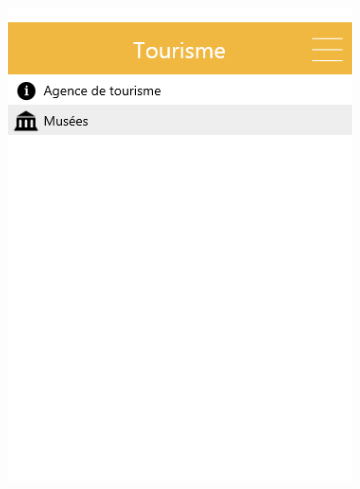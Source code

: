 \documentclass{eplmastersthesis}
\begin{document}
\begin{figure}[H]
\begin{subfigure}[b]{0.3\textwidth}
        \includegraphics[width=\textwidth]{Images/InVision/menu-tourisme.png}
    \end{subfigure}
\end{figure}
\end{document}

